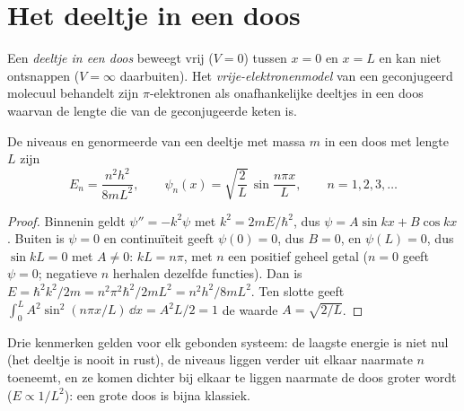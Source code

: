 \section{Het deeltje in een doos}

\begin{definition}\label{def:b3:quantum-model-systems:box}
Een \emph{deeltje in een doos} beweegt vrij ($V = 0$)
tussen $x = 0$ en $x = L$ en kan niet ontsnappen ($V = \infty$ daarbuiten).
Het \emph{vrije-elektronenmodel} van een
geconjugeerd molecuul behandelt zijn $\pi$-elektronen als onafhankelijke
deeltjes in een doos waarvan de lengte die van de geconjugeerde keten is.
\end{definition}

\begin{theorem}\label{thm:b3:quantum-model-systems:box}
De niveaus en genormeerde  van een deeltje met massa $m$ in
een doos met lengte $L$ zijn
\[
E_n = \frac{n^2h^2}{8mL^2}, \qquad \psi_n(x) = \sqrt{\frac2L}\,\sin\frac{n\pi
x}{L}, \qquad n = 1, 2, 3, \dots
\]
\end{theorem}

\begin{proof}
Binnenin geldt $\psi'' = -k^2\psi$ met $k^2 = 2mE/\hbar^2$, dus $\psi = A\sin kx +
B\cos kx$. Buiten is $\psi = 0$ en continuïteit geeft $\psi(0) = 0$, dus $B =
0$, en $\psi(L) = 0$, dus $\sin kL = 0$ met $A \ne 0$: $kL = n\pi$, met $n$ een
positief geheel getal ($n = 0$ geeft $\psi = 0$; negatieve $n$ herhalen dezelfde
functies). Dan is $E = \hbar^2k^2/2m = n^2\pi^2\hbar^2/2mL^2 = n^2h^2/8mL^2$.
Ten slotte geeft $\int_0^L A^2\sin^2(n\pi x/L)\,\dd x = A^2L/2 = 1$ de waarde $A =
\sqrt{2/L}$.
\end{proof}

Drie kenmerken gelden voor elk gebonden systeem: de laagste energie is niet
nul (het deeltje is nooit in rust), de niveaus liggen verder uit elkaar
naarmate $n$ toeneemt, en ze komen dichter bij elkaar te liggen naarmate de
doos groter wordt ($E \propto 1/L^2$): een grote doos is bijna klassiek.

